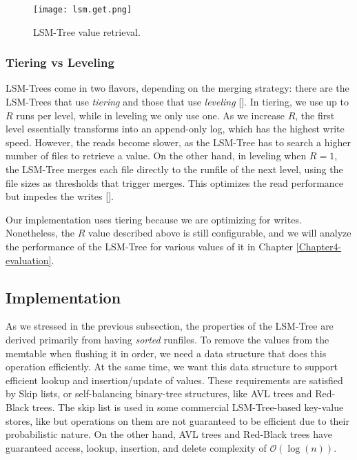 \begin{figure}[h]
    \centering
    \texttt{[image: lsm.get.png]}
    \caption{LSM-Tree value retrieval.}
    \label{fig:lsm.get}
\end{figure}

\subsubsection{Tiering vs Leveling}

LSM-Trees come in two flavors, depending on the merging strategy: there are the LSM-Trees that use \textit{tiering} and those that use \textit{leveling} [\cite{compactionary}]. In tiering, we use up to $R$ runs per level, while in leveling we only use one.
As we increase $R$, the first level essentially transforms into an append-only log, which has the highest write speed. However, the reads become slower, as the LSM-Tree has to search a higher number of files to retrieve a value. On the other hand, in leveling when $R=1$, the LSM-Tree merges each file directly to the runfile of the next level, using the file sizes as thresholds that trigger merges. This optimizes the read performance but impedes the writes [\cite{lsm-design-space}].

Our implementation uses tiering because we are optimizing for writes. Nonetheless, the $R$ value described above is still configurable, and we will analyze the performance of the LSM-Tree for various values of it in Chapter \ref{Chapter4-evaluation}.

\subsection{Implementation}

As we stressed in the previous subsection, the properties of the LSM-Tree are derived primarily from having \textit{sorted} runfiles.
To remove the values from the memtable when flushing it in order, we need a data structure that does this operation efficiently.
At the same time, we want this data structure to support efficient lookup and insertion/update of values.
These requirements are satisfied by Skip lists, or self-balancing binary-tree structures, like AVL trees and Red-Black trees. The skip list is used in some commercial LSM-Tree-based key-value stores, like \cite{leveldb} but operations on them are not guaranteed to be efficient due to their probabilistic nature. On the other hand, AVL trees and Red-Black trees have guaranteed access, lookup, insertion, and delete complexity of $\mathcal{O}(\log{}(n))$.

